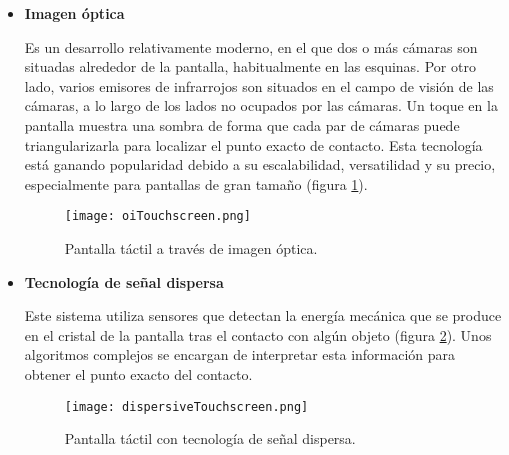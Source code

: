 \begin{itemize}
Este tipo de pantallas son muy resistentes por lo que son utilizadas 
en muchas de las aplicaciones militares que exigen una pantalla táctil.
Por otro lado, tienen el inconveniente de que son sensibles a la 
suciedad y el polvo; y pueden sufrir paralelaje\footnote{Cuando el marco
(donde se sitúan los emisores y receptores) o la pantalla se desvían de su 
posición original, por un golpe por ejemplo, el usuario notará que las 
coordenadas que selecciona no corresponden con las coordenadas que quedan
marcadas en la pantalla.}.

\item \textbf{Imagen óptica}

Es un desarrollo relativamente moderno, en el que dos o más cámaras son 
situadas alrededor de la pantalla, habitualmente en las esquinas. Por otro 
lado, varios emisores de infrarrojos son situados en el campo de visión de las
cámaras, a lo largo de los lados no ocupados por las cámaras. Un toque en la 
pantalla muestra una sombra de forma que cada par de cámaras puede 
triangularizarla para localizar el punto exacto de contacto. Esta tecnología 
está ganando popularidad debido a su escalabilidad, versatilidad y su precio, 
especialmente para pantallas de gran tamaño (figura \ref{fig:oiTouchscreen}).

  \begin{figure}[h]
    \begin{center}
      \texttt{[image: oiTouchscreen.png]}
      \caption{Pantalla táctil a través de imagen óptica.}
      \label{fig:oiTouchscreen}
    \end{center}
  \end{figure}

\item \textbf{Tecnología de señal dispersa}

Este sistema utiliza sensores que detectan la energía mecánica que se produce
en el cristal de la pantalla tras el contacto con algún objeto (figura
\ref{fig:dispersiveTouchscreen}). Unos algoritmos complejos se encargan de 
interpretar esta información para obtener el punto exacto del contacto.

  \begin{figure}[h]
    \begin{center}
      \texttt{[image: dispersiveTouchscreen.png]}
      \caption{Pantalla táctil con tecnología de señal dispersa.}
      \label{fig:dispersiveTouchscreen}
    \end{center}
  \end{figure}


\end{itemize}
